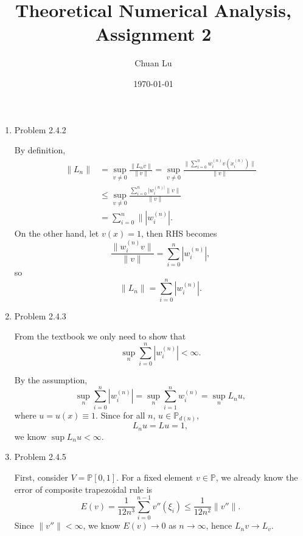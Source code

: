 \documentclass{article}%
\newcommand{\lv}{\lVert}
\newcommand{\rv}{\rVert}
\begin{document}
\title{Theoretical Numerical Analysis, Assignment 2}
\author{Chuan Lu}
\date{\today}
\maketitle

\begin{enumerate}

\item Problem 2.4.2

By definition,
\begin{equation}
\begin{aligned}
\lv L_n\rv &= \sup_{v\ne 0}\frac{\lv L_n v\rv}{\lv v\rv}  = \sup_{v \ne 0}\frac{\lv \sum_{i=0}^{n} w_i^{(n)} v(x_i^{(n)}) \rv}{\lv v\rv} \\
&\le \sup_{v \ne 0}\frac{\sum_{i=0}^{n}|w_i^{(n)|}\lv v\rv}{\lv v\rv} \\
&= \sum_{i=0}^{n}\lv |w_i^{(n)}|.
\end{aligned}
\end{equation}
On the other hand, let $v(x) =  1$, then RHS becomes
\begin{equation}
\frac{\lv w_i^{(n)} v\rv}{\lv v\rv} = \sum_{i=0}^{n}|w_i^{(n)}|,
\end{equation}
so
\begin{equation}
\lv L_n\rv = \sum_{i=0}^{n}|w_i^{(n)}|.
\end{equation}

\item Problem 2.4.3

From the textbook we only need to show that 
\begin{equation}
\sup_n \sum_{i=0}^{n}|w_i^{(n)}| < \infty.
\end{equation}

By the assumption,
\begin{equation}
\sup_n \sum_{i=0}^{n}|w_i^{(n)}| = \sup_n \sum_{i=1}^{n}w_i^{(n)} = \sup_n L_n u,
\end{equation}
where $u = u(x) \equiv 1$. Since for all $n$, $u\in \mathbb{P}_{d(n)} $,
\begin{equation}
L_n u = Lu = 1,
\end{equation}
we know $\sup L_n u < \infty $.

\item Problem 2.4.5

First, consider $V = \mathbb{P}[0, 1] $. For a fixed element $v\in \mathbb{P}$, we already know the error of composite trapezoidal rule is
\begin{equation}
E(v) = \frac{1}{12n^3}\sum_{i=0}^{n-1}v''(\xi_i)\le \frac{1}{12n^2}\lv v''\rv.
\end{equation}
Since $\lv v'' \rv < \infty$, we know $E(v) \to 0$ as $n\to\infty$, hence $L_n v \to L_v $.


\end{enumerate}
\end{document}
